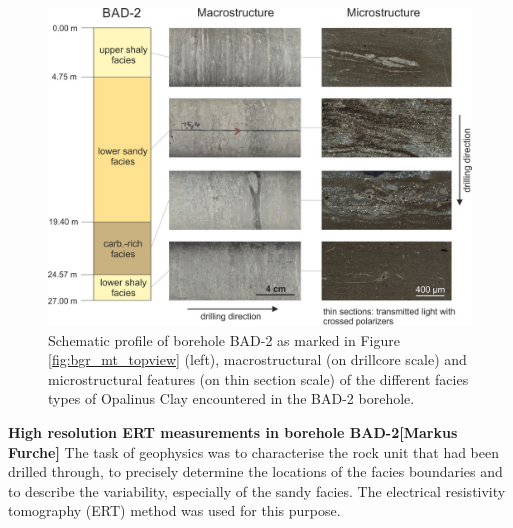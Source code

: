\begin{figure}[!ht]
\centering
\includegraphics[width=1\textwidth]{./figures/bgr_AD_experiment.jpg}
\caption{Schematic profile of borehole BAD-2 as marked in Figure \ref{fig:bgr_mt_topview} (left), macrostructural (on drillcore scale) and microstructural features (on thin section scale) of the different facies types of Opalinus Clay encountered in the BAD-2 borehole.}
\label{fig:bgr_AD_experiment}
\end{figure}

\textbf{High resolution ERT measurements in borehole BAD-2[Markus Furche]}
The task of geophysics was to characterise the rock unit that had been drilled through, to precisely determine the locations of the facies boundaries and to describe the variability, especially of the sandy facies. The electrical resistivity tomography (ERT) method was used for this purpose.

